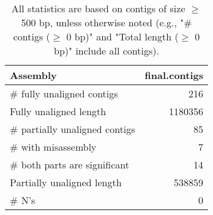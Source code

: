\documentclass[12pt,a4paper]{article}
\begin{document}
\begin{table}[ht]
\begin{center}
\caption{All statistics are based on contigs of size $\geq$ 500 bp, unless otherwise noted (e.g., "\# contigs ($\geq$ 0 bp)" and "Total length ($\geq$ 0 bp)" include all contigs).}
\begin{tabular}{|l*{1}{|r}|}
\hline
Assembly & final.contigs \\ \hline
\# fully unaligned contigs & 216 \\ \hline
Fully unaligned length & 1180356 \\ \hline
\# partially unaligned contigs & 85 \\ \hline
\hspace{5mm}\# with misassembly & 7 \\ \hline
\hspace{5mm}\# both parts are significant & 14 \\ \hline
Partially unaligned length & 538859 \\ \hline
\# N's & 0 \\ \hline
\end{tabular}
\end{center}
\end{table}
\end{document}

